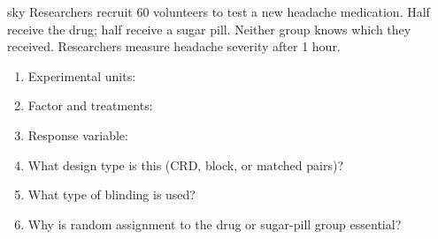 \documentclass[10pt]{article}
\begin{document}
\namedateperiod

\vspace{0.14in}

\begin{scenariobox}[Context]{sky}
\small
Researchers recruit 60 volunteers to test a new headache medication. Half receive the
drug; half receive a sugar pill. Neither group knows which they received. Researchers
measure headache severity after 1 hour.
\end{scenariobox}

\vspace{0.1in}

\begin{practicebox}
\small
\begin{enumerate}[leftmargin=1.5em, itemsep=10pt]
  \item Experimental units: \blank{8cm}

  \item Factor and treatments: \blank{8cm}

  \item Response variable: \blank{8cm}

  \item What design type is this (CRD, block, or matched pairs)? \blank{5cm}

  \item What type of blinding is used? \blank{6cm}

  \item Why is random assignment to the drug or sugar-pill group essential?\\
        \writeline\\[1pt]\writeline
\end{enumerate}
\end{practicebox}
\end{document}
